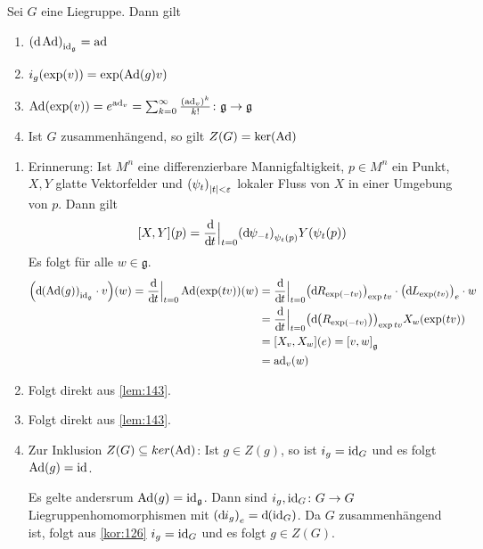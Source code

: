 \begin{lemma}
	Sei $G$ eine Liegruppe.
	Dann gilt
	\begin{enumerate}[(1)]
		\item $\enbrace*{\mathd \Ad}_{\id_{\mathfrak{g}}} = \ad$
		\item $i_g \enbrace*{\exp(v)} = \exp \enbrace*{\Ad(g)v}$
		\item $\Ad \enbrace*{\exp(v)} = e^{\ad_v} = \sum_{k=0}^{\infty} \frac{(\ad_v)^k}{k!} \colon \mathfrak{g} \to \mathfrak{g}$
		\item Ist $G$ zusammenhängend, so gilt $Z(G) = \ker (\Ad)$
	\end{enumerate}
\end{lemma}
\begin{beweis}
	\begin{enumerate}[(1)]
		\item Erinnerung: Ist $M^n$ eine differenzierbare Mannigfaltigkeit, $p \in M^n$ ein Punkt, $X,Y$ glatte Vektorfelder und $\enbrace*{\psi_t}_{\abs*{t}<\varepsilon}$ lokaler Fluss von $X$ in einer Umgebung von $p$.
		Dann gilt
		\[
			\benbrace*{X,Y}(p) = \diffd{}{t}\Big|_{t=0} \enbrace*{\mathd \psi_{-t}}_{\psi_t(p)} Y \enbrace*{\psi_t(p)}
		\]
		Es folgt für alle $w \in \mathfrak{g}$.
		\begin{align}
			\enbrace*{\mathd \enbrace*{\Ad(g)}_{\id_{\mathfrak{g}}} \cdot v} (w) = \diffd{}{t}\Big|_{t=0} \Ad \enbrace*{\exp(tv)}(w) &= \diffd{}{t}\Big|_{t=0} \enbrace*{\mathd R_{\exp(-tv)}}_{\exp{tv}} \cdot  \enbrace*{\mathd L_{\exp(tv)}}_{e} \cdot w \\
			&= \diffd{}{t}\Big|_{t=0} \enbrace*{\mathd\enbrace*{R_{\exp(-tv)}}}_{\exp{tv}} X_w \enbrace*{\exp(tv)} \\
			&= \benbrace*{X_v,X_w}(e)  = \benbrace*{v,w}_{\mathfrak{g}} \\
			&= \ad_v(w)
		\end{align}
		\item Folgt direkt aus \autoref{lem:143}.
		\item Folgt direkt aus \autoref{lem:143}.
		\item Zur Inklusion $Z(G) \subseteq ker (\Ad)$: Ist $g \in Z(g)$, so ist $i_g = {\id_G} $ und es folgt $\Ad(g)=\id$.
		
		Es gelte andersrum $\Ad(g) = \id_{\mathfrak{g}}$.
		Dann sind $i_g, \id_G \colon G \to G$ Liegruppenhomomorphismen mit $\enbrace*{\mathd i_g}_e = \mathd(\id_G)$.
		Da $G$ zusammenhängend ist, folgt aus \autoref{kor:126} $i_g=\id_G$ und es folgt $g \in Z(G)$.
	\end{enumerate}
\end{beweis}

